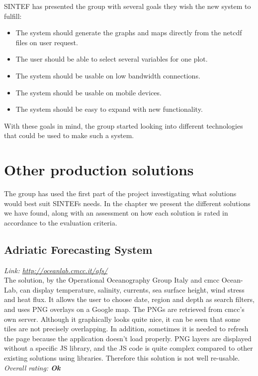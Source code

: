 \documentclass[11pt,a4paper,titlepage,oneside]{report}
\begin{document}
SINTEF has presented the group with several goals they wish the new system to fulfill:

\begin{itemize}
\item The system should generate the graphs and maps directly from the \gls{netcdf} files on user request.
\item The user should be able to select several variables for one plot.
\item The system should be usable on low bandwidth connections.
\item The system should be usable on mobile devices.
\item The system should be easy to expand with new functionality.
\end{itemize} 

With these goals in mind, the group started looking into different technologies that could be used to make such a system.

\section{Other production solutions}
The group has used the first part of the project investigating what solutions would best suit SINTEFs needs. In the chapter we present the different solutions we have found, along with an assessment on how each solution is rated in accordance to the evaluation criteria. 

\subsection{Adriatic Forecasting System}
\emph{Link: \url{http://oceanlab.cmcc.it/afs/}} \\%
  The solution, by the Operational Oceanography Group Italy and cmcc Ocean-Lab, can display temperature, salinity, currents, sea surface height, wind stress and heat flux. It allows the user to choose date, region and depth as search filters, and uses \gls{PNG} overlays on a Google map. The PNGs are retrieved from cmcc's own server.
  Although it graphically looks quite nice, it can be seen that some tiles are not precisely overlapping. In addition, sometimes it is needed to refresh the page because the application doesn't load properly. \gls{PNG} layers are displayed without a specific JS library, and the JS code is quite complex compared to other existing solutions using libraries. Therefore this solution is not well re-usable.
\\ \emph{Overall rating: \textbf{Ok}}
\end{document}
